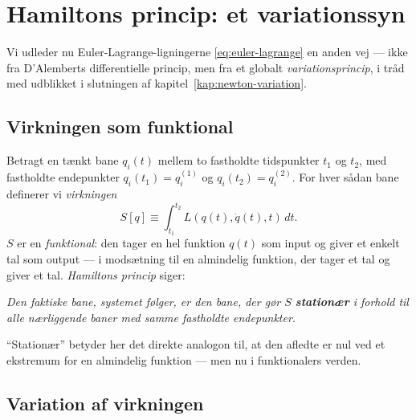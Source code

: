 \section{Hamiltons princip: et variationssyn}
\label{sec:hamiltons-princip}

Vi udleder nu Euler-Lagrange-ligningerne \eqref{eq:euler-lagrange} en
anden vej — ikke fra D'Alemberts differentielle princip, men fra et
globalt \emph{variationsprincip}, i tråd med udblikket i slutningen af
kapitel~\ref{kap:newton-variation}.

\subsection{Virkningen som funktional}

Betragt en tænkt bane $q_i(t)$ mellem to fastholdte tidspunkter $t_1$
og $t_2$, med fastholdte endepunkter
$q_i(t_1)=q_i^{(1)}$ og $q_i(t_2)=q_i^{(2)}$. For hver sådan bane
definerer vi \emph{virkningen}
\begin{equation}
  S[q] \equiv \int_{t_1}^{t_2} L(q(t),\dot q(t),t)\,dt.
  \label{eq:virkning}
\end{equation}
$S$ er en \emph{funktional}: den tager en hel funktion $q(t)$ som
input og giver et enkelt tal som output — i modsætning til en
almindelig funktion, der tager et tal og giver et tal.
\emph{Hamiltons princip} siger:

\begin{center}
\emph{Den faktiske bane, systemet følger, er den bane, der gør $S$
\textbf{stationær} i forhold til alle nærliggende baner med samme
fastholdte endepunkter.}
\end{center}

``Stationær'' betyder her det direkte analogon til, at den afledte er
nul ved et ekstremum for en almindelig funktion — men nu i
funktionalers verden.

\subsection{Variation af virkningen}

